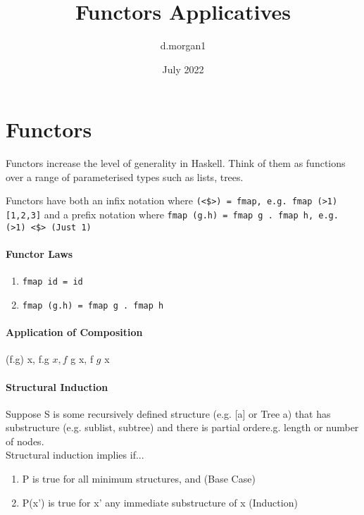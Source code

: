 \documentclass{article}
\title{Functors Applicatives}
\author{d.morgan1}
\date{July 2022}
\begin{document}
\maketitle

\section{Functors}
Functors increase the level of generality in Haskell. Think of them as functions over a range of parameterised types such as lists, trees. \newline

\noindent Functors have both an \textcolor{Mulberry}{infix notation} where \texttt{\textcolor{Emerald}{(<\$>) = fmap}, e.g. fmap (>1) [1,2,3]} and a \textcolor{Mulberry}{prefix notation} where \texttt{\textcolor{Emerald}{fmap (g.h) = fmap g . fmap h}, e.g. (>1) <\$> (Just 1)}

\paragraph{Functor Laws}
\begin{enumerate}
  \item \texttt{fmap id = id}
  \item \texttt{fmap (g.h) = fmap g . fmap h}
\end{enumerate}

\paragraph{Application of Composition}
(f.g) x, f.g $ x, f $ g x, f $ g $ x

\paragraph{Structural Induction}
Suppose S is some \textcolor{Mulberry}{recursively defined structure} (e.g. [a] or Tree a) that has \textcolor{Mulberry}{substructure} (e.g. sublist, subtree) and there is \textcolor{Mulberry}{partial order}{e.g. length or number of nodes}. 
\\
\textcolor{Mulberry}{Structural induction} implies if...
\begin{enumerate}
  \item P is true for \textcolor{Mulberry}{all minimum structures}, and     (Base Case)
  \item P(x') is true for x' any \textcolor{Mulberry}{immediate substructure} of x (Induction)
\end{enumerate}
\end{document}
